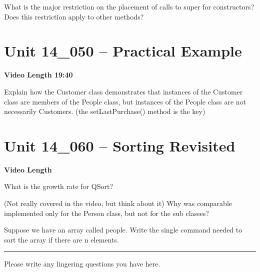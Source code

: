 \documentclass[letterpaper,12pt]{exam}
\newcommand{\unit}{Unit 14}
\begin{document}
\begin{questions}
\begin{samepage}
    \question What is the major restriction on the placement of calls to super for constructors?  Does this restriction apply to other methods?
    \vspace{5mm}
\end{samepage}



\section*{\unit\_050 -- Practical Example} 
\par{\selectfont\textbf{Video Length 19:40}}

\begin{samepage}
    \question Explain how the Customer class demonstrates that instances of the Customer class are members of the People class, but instances of the People class are not necessarily Customers.  (the setLastPurchase() method is the key)
    \vspace{25mm}
\end{samepage}


\section*{\unit\_060 -- Sorting Revisited} 
\par{\selectfont\textbf{Video Length }}

\begin{samepage}
    \question What is the growth rate for QSort?
    \vspace{5mm}
\end{samepage}

\begin{samepage}
    \question (Not really covered in the video, but think about it) Why was comparable implemented only for the Person class, but not for the sub classes?
    \vspace{5mm}
\end{samepage}

\begin{samepage}
    \question Suppose we have an array called people.  Write the single command needed to sort the array if there are n elements.
    \vspace{5mm}
\end{samepage}


\begin{center}
    \rule{0.5\textwidth}{.4pt}
\end{center}
Please write any lingering questions you have here.
\end{questions}
\end{document}
